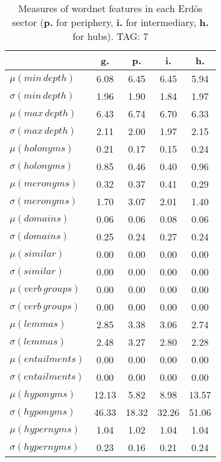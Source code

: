 \begin{table}[h!]
\begin{center}
\begin{tabular}{| l || c | c | c | c |}\hline
 & {\bf g.} & {\bf p.} & {\bf i.} & {\bf h.} \\\hline\hline
$\mu(min\,depth)$ & 6.08  & 6.45  & 6.45  & 5.94 \\
$\sigma(min\,depth)$ & 1.96  & 1.90  & 1.84  & 1.97 \\\hline
$\mu(max\,depth)$ & 6.43  & 6.74  & 6.70  & 6.33 \\
$\sigma(max\,depth)$ & 2.11  & 2.00  & 1.97  & 2.15 \\\hline
$\mu(holonyms)$ & 0.21  & 0.17  & 0.15  & 0.24 \\
$\sigma(holonyms)$ & 0.85  & 0.46  & 0.40  & 0.96 \\\hline
$\mu(meronyms)$ & 0.32  & 0.37  & 0.41  & 0.29 \\
$\sigma(meronyms)$ & 1.70  & 3.07  & 2.01  & 1.40 \\\hline
$\mu(domains)$ & 0.06  & 0.06  & 0.08  & 0.06 \\
$\sigma(domains)$ & 0.25  & 0.24  & 0.27  & 0.24 \\\hline
$\mu(similar)$ & 0.00  & 0.00  & 0.00  & 0.00 \\
$\sigma(similar)$ & 0.00  & 0.00  & 0.00  & 0.00 \\\hline
$\mu(verb\,groups)$ & 0.00  & 0.00  & 0.00  & 0.00 \\
$\sigma(verb\,groups)$ & 0.00  & 0.00  & 0.00  & 0.00 \\\hline
$\mu(lemmas)$ & 2.85  & 3.38  & 3.06  & 2.74 \\
$\sigma(lemmas)$ & 2.48  & 3.27  & 2.80  & 2.28 \\\hline
$\mu(entailments)$ & 0.00  & 0.00  & 0.00  & 0.00 \\
$\sigma(entailments)$ & 0.00  & 0.00  & 0.00  & 0.00 \\\hline
$\mu(hyponyms)$ & 12.13  & 5.82  & 8.98  & 13.57 \\
$\sigma(hyponyms)$ & 46.33  & 18.32  & 32.26  & 51.06 \\\hline
$\mu(hypernyms)$ & 1.04  & 1.02  & 1.04  & 1.04 \\
$\sigma(hypernyms)$ & 0.23  & 0.16  & 0.21  & 0.24 \\\hline
\end{tabular}
\caption{Measures of wordnet features in each Erd\"os sector ({{\bf p.}} for periphery, {{\bf i.}} for intermediary, {{\bf h.}} for hubs). TAG: 7}
\end{center}
\end{table}